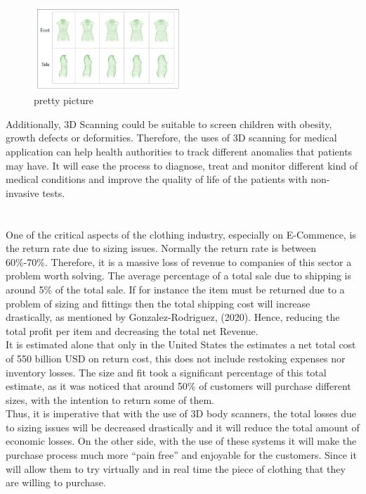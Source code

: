 \documentclass[a4paper]{article}
\begin{document}
\begin{figure}[h]
    \begin{center}
    \includegraphics[width=0.5\textwidth]{bodyMedicine.png}
    \caption{pretty picture}
    \label{bodymed}
\end{center}
\end{figure}
Additionally, 3D Scanning could be suitable to screen children with obesity, growth defects or deformities.
Therefore, the uses of 3D scanning for medical application can help health authorities to track different anomalies that patients may have.
It will ease the process to diagnose, treat and monitor different kind of medical conditions and improve the quality of life of the patients with non-invasive tests. \\[12pt] 
\enlargethispage{\baselineskip}


\section*{}
One of the critical aspects of the clothing industry, especially on E-Commence, is the return rate due to sizing issues. Normally the return rate is between 60\%-70\%.
Therefore, it is a massive loss of revenue to companies of this sector a problem worth solving. 
The average percentage of a total sale due to shipping is around 5\% of the total sale. 
If for instance the item must be returned due to a problem of sizing and fittings then the total shipping cost will increase drastically, as mentioned by Gonzalez-Rodriguez, (2020). 
Hence, reducing the total profit per item and decreasing the total net Revenue.\\[10pt]
It is estimated alone that only in the United States the estimates a net total cost of 550 billion USD on return cost, this does not include restoking expenses nor inventory losses.
The size and fit took a significant percentage of this total estimate, as it was noticed that around 50\% of customers will purchase different sizes, with the intention to return some of them.\\[10pt]
Thus, it is imperative that with the use of 3D body scanners, the total losses due to sizing issues will be decreased drastically and it will reduce the total amount of economic losses.
On the other side, with the use of these systems it will make the purchase process much more “pain free” and enjoyable for the customers. Since it will allow them to try virtually and in real time the piece of clothing that they are willing to purchase.
\end{document}
